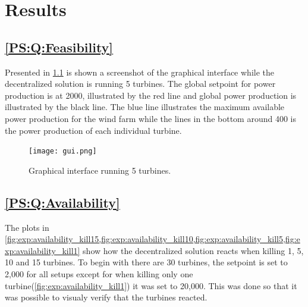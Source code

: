 
\newcommand{\resultsPlotWidthScale}{1}
\newcommand{\resultsFigureWidthScale}{0.6}

\chapter{Results}
\label{chap:results}

\section{\ref{PS:Q:Feasibility}}
\label{sec:exp:feasibility}
Presented in \cref{fig:graphicalInterface} is shown a screenshot of the graphical interface while the decentralized solution is running 5 turbines.
The global setpoint for power production is at 2000, illustrated by the red line and global power production is illustrated by the black line.
The blue line illustrates the maximum available power production for the wind farm while the lines in the bottom around 400 is the power production of each individual turbine.

\begin{figure} [!h]
	\centering
	\texttt{[image: gui.png]} 
	\caption[Graphical interface running 5 turbines]{
		\label{fig:graphicalInterface} 
		\footnotesize{%
			Graphical interface running 5 turbines.
		}
	}
\end{figure}


\section{\ref{PS:Q:Availability}}\FloatBarrier

The plots in \cref{fig:exp:availability_kill15,fig:exp:availability_kill10,fig:exp:availability_kill5,fig:exp:availability_kill1} show how the decentralized solution reacts when killing 1, 5, 10 and 15 turbines. To begin with there are 30 turbines, the setpoint is set to 2,000 for all setups except for when killing only one turbine(\cref{fig:exp:availability_kill1}) it was set to 20,000. This was done so that it was possible to visualy verify that the turbines reacted.


